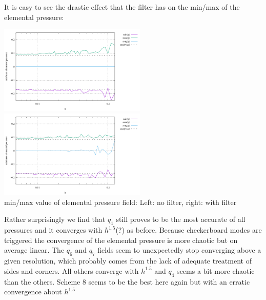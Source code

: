 It is easy to see the drastic effect that the filter has on the min/max of the elemental pressure:
\begin{center}
\includegraphics[width=7cm]{python_codes/fieldstone_12/results/rand/rawp_nofilter}
\includegraphics[width=7cm]{python_codes/fieldstone_12/results/rand/rawp_filter}\\
{\captionfont min/max value of elemental pressure field: Left: no filter, right: with filter}
\end{center}

Rather surprisingly we find that $q_1$ still proves to be the most accurate of all pressures and it converges
with $h^{1.5}$(?) as before. Because checkerboard modes are triggered the convergence of the elemental 
pressure is more chaotic but on average linear. 
The $q_6$ and $q_7$ fields seem to unexpectedly stop converging above a given resolution, which 
probably comes from the lack of adequate treatment of sides and corners.
All others converge with $h^{1.5}$ and $q_4$ seems a bit more chaotic than the others.
Scheme 8 seems to be the best here again but with an erratic convergence about $h^{1.5}$

